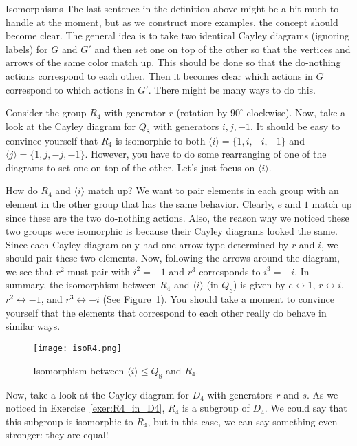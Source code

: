 \begin{section}{Isomorphisms}
The last sentence in the definition above might be a bit much to handle at the moment, but as we construct more examples, the concept should become clear.  The general idea is to take two identical Cayley diagrams (ignoring labels) for \(G\) and \(G'\) and then set one on top of the other so that the vertices and arrows of the same color match up.  This should be done so that the do-nothing actions correspond to each other.  Then it becomes clear which actions in \(G\) correspond to which actions in \(G'\).  There might be many ways to do this.

Consider the group \(R_4\) with generator \(r\) (rotation by \(90^\circ\) clockwise).  Now, take a look at the Cayley diagram for \(Q_8\) with generators \(i, j, -1\).  It should be easy to convince yourself that \(R_4\) is isomorphic to both \(\langle i\rangle=\{1,i,-i,-1\}\) and \(\langle j\rangle=\{1,j,-j,-1\}\).  However, you have to do some rearranging of one of the diagrams to set one on top of the other.  Let's just focus on \(\langle i\rangle\).  

How do \(R_4\) and \(\langle i\rangle\) match up?  We want to pair elements in each group with an element in the other group that has the same behavior.  Clearly, \(e\) and \(1\) match up since these are the two do-nothing actions.  Also, the reason why we noticed these two groups were isomorphic is because their Cayley diagrams looked the same.  Since each Cayley diagram only had one arrow type determined by \(r\) and \(i\), we should pair these two elements.  Now, following the arrows around the diagram, we see that \(r^2\) must pair with \(i^2=-1\) and \(r^3\) corresponds to \(i^3=-i\).  In summary, the isomorphism between \(R_4\) and \(\langle i\rangle\) (in \(Q_8\)) is given by \(e\leftrightarrow 1\), \(r\leftrightarrow i\), \(r^2\leftrightarrow -1\), and \(r^3\leftrightarrow -i\) (See Figure~\ref{fig:isoR4}).  You should take a moment to convince yourself that the elements that correspond to each other really do behave in similar ways.

\begin{figure}\label{fig:isoR4}
\begin{center}
\texttt{[image: isoR4.png]}
\end{center}
\caption{Isomorphism between \(\langle i\rangle\leq Q_8\) and \(R_4\).}
\end{figure}

Now, take a look at the Cayley diagram for \(D_4\) with generators \(r\) and \(s\).  As we noticed in Exercise~\ref{exer:R4_in_D4}, \(R_4\) is a subgroup of \(D_4\).  We could say that this subgroup is isomorphic to \(R_4\), but in this case, we can say something even stronger: they are equal!


\end{section}

